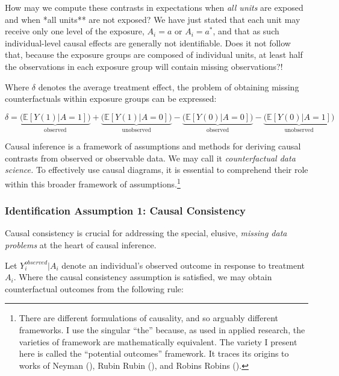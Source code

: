 \documentclass[
  singlecolumn]{article}
\begin{document}
How may we compute these contrasts in expectations when \emph{all units}
are exposed and when *all units** are not exposed? We have just stated
that each unit may receive only one level of the exposure, \(A_i = a\)
or \(A_i = a^*\), and that as such individual-level causal effects are
generally not identifiable. Does it not follow that, because the
exposure groups are composed of individual units, at least half the
observations in each exposure group will contain missing observations?!

Where \(\delta\) denotes the average treatment effect, the problem of
obtaining missing counterfactuals within exposure groups can be
expressed:

\[
\delta = \underbrace{\big(\mathbb{E}[Y(1)|A = 1]\big)}_{\text{observed}} + \underbrace{\big(\mathbb{E}[Y(1)|A = 0]\big)}_{\text{unobserved}} - \underbrace{\big(\mathbb{E}[Y(0)|A = 0]\big)}_{\text{observed}}  - \underbrace{\big(\mathbb{E}[Y(0)|A = 1]\big)}_{\text{unobserved}}
\]

Causal inference is a framework of assumptions and methods for deriving
causal contrasts from observed or observable data. We may call it
\emph{counterfactual data science.} To effectively use causal diagrams,
it is essential to comprehend their role within this broader framework
of assumptions.\footnote{There are different formulations of causality,
  and so arguably different frameworks. I use the singular ``the''
  because, as used in applied research, the varieties of framework are
  mathematically equivalent. The variety I present here is called the
  ``potential outcomes'' framework. It traces its origins to works of
  Neyman (), Rubin Rubin
  (), and Robins Robins
  ().}

\subsubsection{Identification Assumption 1: Causal
Consistency}\label{identification-assumption-1-causal-consistency}

Causal consistency is crucial for addressing the special, elusive,
\emph{missing data problems} at the heart of causal inference.

Let \(Y_i^{observed}|A_i\) denote an individual's observed outcome in
response to treatment \(A_i\). Where the causal consistency assumption
is satisfied, we may obtain counterfactual outcomes from the following
rule:
\end{document}
